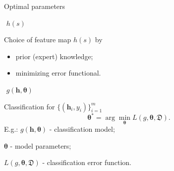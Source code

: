 \documentclass{beamer}
\begin{document}
\begin{frame}{Optimal parameters}
	
	\begin{minipage}[t]{0.15\columnwidth}
		\vspace{-0.6cm}
		\begin{block}{}
			\centering
			\vspace{0.5cm}
			$\,\,h(s)$
			\vspace{0.5cm}
		\end{block}
	\end{minipage}	
	\hfill
	\begin{minipage}[t]{0.8\columnwidth}
			Choice of feature map $h(s)$ by 
			\begin{itemize}
				\item prior (expert) knowledge;
				\item minimizing error functional.
			\end{itemize}
	\end{minipage}
\vfill
	\begin{minipage}[t]{0.15\columnwidth}
		\vspace{-0.6cm}
		\begin{block}{}
			\centering
			\vspace{1.3cm}
			$\,\,g(\bm{h}, \bm\theta)$
			\vspace{1.3cm}
		\end{block}
	\end{minipage}	
	\hfill
	\begin{minipage}[t]{0.8\columnwidth}
			Classification for $\{(\bm{h}_i , y_i)\}_{i=1}^m$
			\[
				\bm{\theta}^* = \arg \min_{\bm\theta} L(g, \bm\theta, \mathfrak{D}).
			\]
		E.g.: $g(\mathbf{h}, \bm\theta)$ - classification model;
		
		\hspace{0.9cm}$\bm\theta$ - model parameters;
				
		\hspace{0.9cm}$L (g, \bm\theta, \mathfrak{D})$ - classification error function.
	\end{minipage}	

	

\end{frame}
\end{document}

